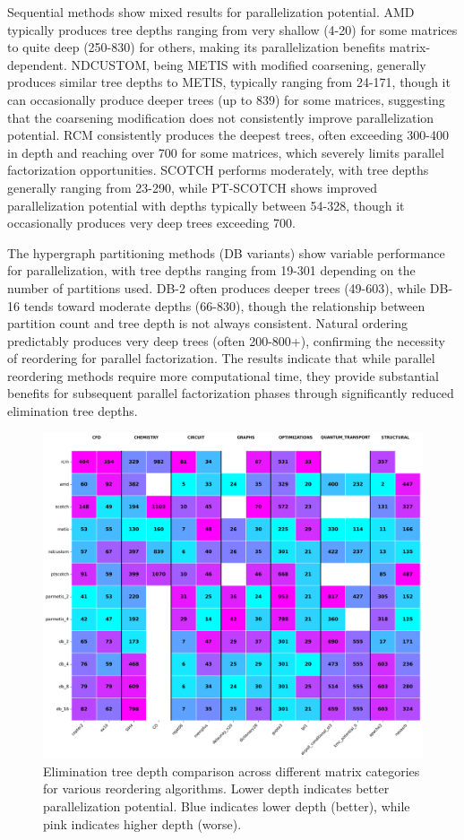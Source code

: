 Sequential methods show mixed results for parallelization potential. AMD typically produces tree depths ranging from very shallow (4-20) for some matrices to quite deep (250-830) for others, making its parallelization benefits matrix-dependent. NDCUSTOM, being METIS with modified coarsening, generally produces similar tree depths to METIS, typically ranging from 24-171, though it can occasionally produce deeper trees (up to 839) for some matrices, suggesting that the coarsening modification does not consistently improve parallelization potential. RCM consistently produces the deepest trees, often exceeding 300-400 in depth and reaching over 700 for some matrices, which severely limits parallel factorization opportunities. SCOTCH performs moderately, with tree depths generally ranging from 23-290, while PT-SCOTCH shows improved parallelization potential with depths typically between 54-328, though it occasionally produces very deep trees exceeding 700.

The hypergraph partitioning methods (DB variants) show variable performance for parallelization, with tree depths ranging from 19-301 depending on the number of partitions used. DB-2 often produces deeper trees (49-603), while DB-16 tends toward moderate depths (66-830), though the relationship between partition count and tree depth is not always consistent. Natural ordering predictably produces very deep trees (often 200-800+), confirming the necessity of reordering for parallel factorization. The results indicate that while parallel reordering methods require more computational time, they provide substantial benefits for subsequent parallel factorization phases through significantly reduced elimination tree depths.


\begin{figure}[h]
\centering
\includegraphics[width=1\textwidth]{fig/res/elimination_tree_depth_all_categories.png}
\caption{Elimination tree depth comparison across different matrix categories for various reordering algorithms. Lower depth indicates better parallelization potential. Blue indicates lower depth (better), while pink indicates higher depth (worse).}
\label{fig:elimination-tree-depth}
\end{figure}

